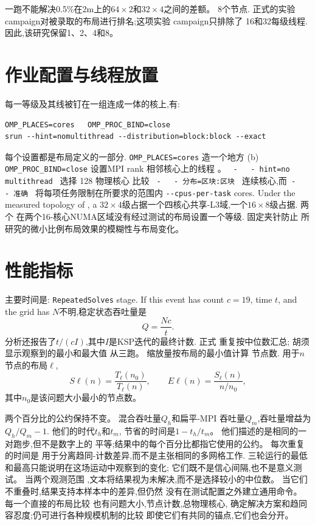 \documentclass[11pt,a4paper,oneside]{report}
\begin{document}
一跑不能解决0.5\%在2m上的$64\times2$和$32\times4$之间的差额。
8个节点. 正式的实验 campaign对被录取的布局进行排名;这项实验 campaign只排除了
16和32每级线程. 因此,该研究保留1、2、4和8。

\section{作业配置与线程放置}
\label{sec:placement}
每一等级及其线被钉在一组连成一体的核上,有:
\begin{verbatim}
OMP_PLACES=cores   OMP_PROC_BIND=close
srun --hint=nomultithread --distribution=block:block --exact
\end{verbatim}

每个设置都是布局定义的一部分. \texttt{OMP\_PLACES=cores} 造一个地方
(b) \texttt{OMP\_PROC\_BIND=close} 设置MPI rank
相邻核心上的线程 。 \texttt { - { } - hint=no multithread } 选择 128 物理核心 比较
\texttt { - { } - 分布=区块:区块 }
连续核心,而\texttt { - { } - 准确 } 将每项任务限制在所要求的范围内
\texttt{-{}-cpus-per-task} cores. Under the measured topology of , a
$32\times4$级占据一个四核心共享-L3域,一个$16\times8$级占据.
两个 在两个16-核心NUMA区域没有经过测试的布局设置一个等级. 固定夹针防止
所研究的微小比例布局效果的模糊性与布局变化。

\section{性能指标}
\label{sec:metrics}
主要时间是:
\texttt{RepeatedSolves} stage. If this event has count $c=19$, time $t$, and the grid has
$N$不明,稳定状态吞吐量是
\[
  Q = \frac{Nc}{t}.
\]
分析还报告了$t/(cI)$,其中$I$是KSP迭代的最终计数. 正式
重复按中位数汇总; 胡须显示观察到的最小和最大值
从三跑。 缩放量按布局的最小值计算
节点数. 用于$n$节点的布局$\ell$,
\[
  S \ell(n) = \frac{T_\ell(n_0)}{T_\ell(n)},\qquad
  E \ell(n) = \frac{S_\ell(n)}{n/n_0},
\]
其中$n_0$是该问题大小最小的节点数。

两个百分比的公约保持不变。 混合吞吐量$Q_h$和扁平-MPI
吞吐量$Q_m$,吞吐量增益为$Q_h/Q_m-1$. 他们的时代$t_h$和$t_m$,
节省的时间是$1-t_h/t_m$。 他们描述的是相同的一对跑步,但不是数字上的
平等;结果中的每个百分比都指它使用的公约。 每次重复的时间是
用于分离趋同-计数差异,而不是主张相同的多网格工作.
三轮运行的最低和最高只能说明在这场运动中观察到的变化;
它们既不是信心间隔,也不是意义测试。 当两个观测范围
,文本将结果视为未解决,而不是选择较小的中位数。
当它们不重叠时,结果支持本样本中的差异,但仍然
没有在测试配置之外建立通用命令。
每一个直接的布局比较 也有问题大小,节点计数,总物理核心,
确定解决方案和趋同容忍度;仍可进行各种规模机制的比较
即使它们有共同的锚点,它们也会分开。
\end{document}
